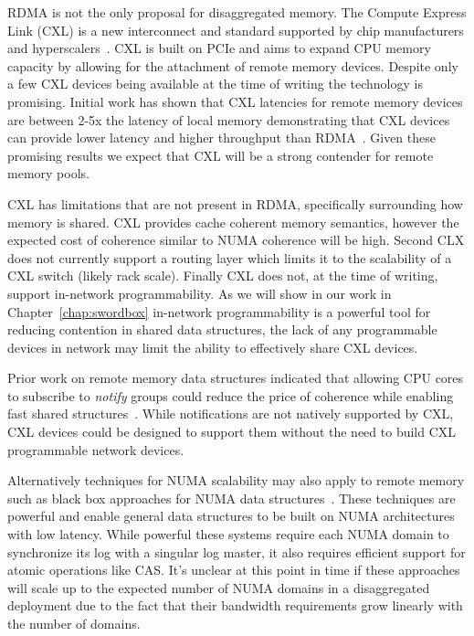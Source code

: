 \documentclass[12pt]{ucsddissertation}
\begin{document}
RDMA is not the only proposal for disaggregated memory. The Compute Express Link (CXL) is a new
interconnect and standard supported by chip manufacturers and hyperscalers~\cite{cxl}. CXL is built on PCIe and
aims to expand CPU memory capacity by allowing for the attachment of remote memory devices. Despite
only a few CXL devices being available at the time of writing the technology is promising. Initial
work has shown that CXL latencies for remote memory devices are between 2-5x the latency of local
memory demonstrating that CXL devices can provide lower latency and higher throughput than
RDMA~\cite{cxl-demyst,tpp,pond}. Given these promising results we expect that CXL will be a strong
contender for remote memory pools.

CXL has limitations that are not present in RDMA, specifically surrounding how memory is shared. CXL
provides cache coherent memory semantics, however the expected cost of coherence similar to NUMA
coherence will be high. Second CLX does not currently support a routing layer which limits it to the
scalability of a CXL switch (likely rack scale). Finally CXL does not, at the time of writing,
support in-network programmability. As we will show in our work in Chapter~\ref{chap:swordbox}
in-network programmability is a powerful tool for reducing contention in shared data structures, the
lack of any programmable devices in network may limit the ability to effectively share CXL devices.

Prior work on remote memory data structures indicated that allowing CPU cores to subscribe to
\textit{notify} groups could reduce the price of coherence while enabling fast shared
structures~\cite{aguilera2019designing}. While notifications are not natively supported by CXL, CXL
devices could be designed to support them without the need to build CXL programmable network
devices. 

Alternatively techniques for NUMA scalability may also apply to remote memory such as black box
approaches for NUMA data structures~\cite{bbn,nros,ironsync}. These techniques are powerful and
enable general data structures to be built on NUMA architectures with low latency. While powerful
these systems require each NUMA domain to synchronize its log with a singular log master, it also
requires efficient support for atomic operations like CAS. It's unclear at this point in time if
these approaches will scale up to the expected number of NUMA domains in a disaggregated deployment
due to the fact that their bandwidth requirements grow linearly with the number of domains.
\end{document}
